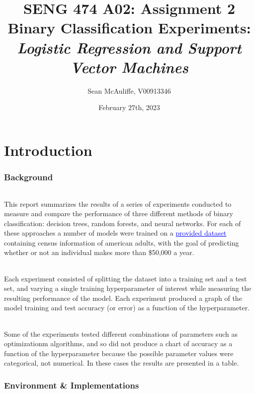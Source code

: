\documentclass[12pt, letterpaper]{article}
\title{SENG 474 A02: Assignment 2 \\[1ex]
\large Binary Classification Experiments:
\large \textit{Logistic Regression and Support Vector Machines}}
\author{Sean McAuliffe, V00913346 }
\date{February 27th, 2023}
\begin{document}
\maketitle

\pagebreak
\tableofcontents
\pagebreak

\part*{Introduction}

\section{Background}

\paragraph*{}This report summarizes the results of a series of experiments
conducted to measure and compare the performance of three different methods of
binary classification: decision trees, random forests, and neural networks. For
each of these approaches a number of models were trained on a
\href{https://archive.ics.uci.edu/ml/datasets/adult}{\textcolor{blue}{\underline{provided dataset}}}
containing census information of american adults, with the goal of predicting
whether or not an individual makes more than \$50,000 a year.

\paragraph*{}Each experiment consisted of splitting the dataset into a
training set and a test set, and varying a single training hyperparameter of
interest while measuring the resulting performance of the model. Each experiment
produced a graph of the model training and test accuracy (or error) as a
function of the hyperparameter.

\paragraph*{}Some of the experiments tested  different combinations of
parameters such as optimizationm algorithms, and so did not produce a chart of
accuracy as a function of the hyperparameter because the possible parameter
values were categorical, not numerical. In these cases the results are
presented in a table.

\section{Environment \& Implementations}
\end{document}
